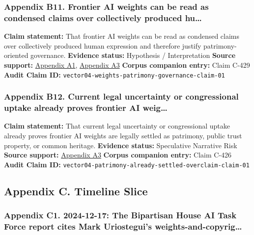 \documentclass[
  american,
  11pt,
  letterpaper,
]{article}
\begin{document}
\subsubsection{Appendix B11. Frontier AI weights can be read as
condensed claims over collectively produced
hu\ldots{}}\label{ch-00-appendix-b11-frontier-ai-weights-can-be-read-as-condensed-claims-over-collectively-produced-hu}

\textbf{Claim statement:} That frontier AI weights can be read as
condensed claims over collectively produced human expression and
therefore justify patrimony-oriented governance. \textbf{Evidence
status:} Hypothesis / Interpretation \textbf{Source support:}
\hyperref[ch-00-appendix-a1-ai-copyright-weights-a-new-frontier-in-intellectual-property-law]{Appendix
A1},
\hyperref[ch-00-appendix-a3-bipartisan-house-task-force-report-on-artificial-intelligence]{Appendix
A3} \textbf{Corpus companion entry:} Claim C-429 \textbf{Audit Claim
ID:} \texttt{vector04-weights-patrimony-governance-claim-01}

\subsubsection{Appendix B12. Current legal uncertainty or congressional
uptake already proves frontier AI
weig\ldots{}}\label{ch-00-appendix-b12-current-legal-uncertainty-or-congressional-uptake-already-proves-frontier-ai-weig}

\textbf{Claim statement:} That current legal uncertainty or
congressional uptake already proves frontier AI weights are legally
settled as patrimony, public trust property, or common heritage.
\textbf{Evidence status:} Speculative Narrative Risk \textbf{Source
support:}
\hyperref[ch-00-appendix-a3-bipartisan-house-task-force-report-on-artificial-intelligence]{Appendix
A3} \textbf{Corpus companion entry:} Claim C-426 \textbf{Audit Claim
ID:} \texttt{vector04-patrimony-already-settled-overclaim-claim-01}

\subsection{Appendix C. Timeline
Slice}\label{appendix-c.-timeline-slice}

\subsubsection{Appendix C1. 2024-12-17: The Bipartisan House AI Task
Force report cites Mark Uriostegui's
weights-and-copyrig\ldots{}}\label{ch-00-appendix-c1-2024-12-17-the-bipartisan-house-ai-task-force-report-cites-mark-uriostegui-s-weights-and-copyright-argument}
\end{document}
